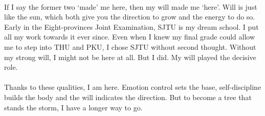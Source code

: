 \documentclass{article}
\begin{document}
\paragraph{}
	\normalsize If I say the former two `made' me here, then my will made me `here'. Will is just like the sun, which both give you the direction to grow and the energy to do so. Early in the Eight-provinces Joint Examination, SJTU is my dream school. I put all my work towards it ever since. Even when I knew my final grade could allow me to step into THU and PKU, I chose SJTU without second thought. Without my strong will, I might not be here at all. But I did. My will played the decisive role.

\paragraph{}
	\normalsize Thanks to these qualities, I am here. Emotion control sets the base, self-discipline builds the body and the will indicates the direction. But to become a tree that stands the storm, I have a longer way to go.
\end{document}
